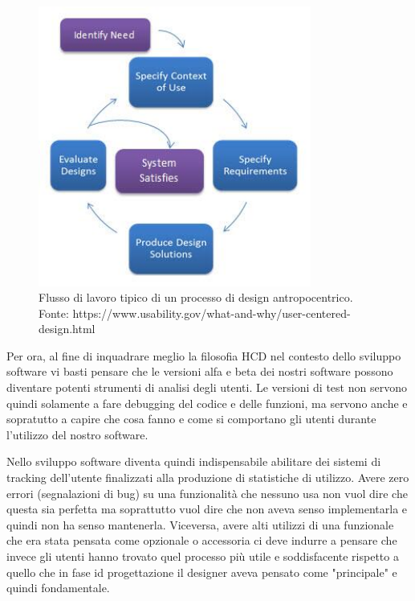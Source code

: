 \begin{figure}[!h]
	\centering
	\includegraphics[width=0.8\textwidth]{immagini/HCD-chart}
	\caption{Flusso di lavoro tipico di un processo di design antropocentrico. Fonte: https://www.usability.gov/what-and-why/user-centered-design.html}
	\label{hcd-chart}
\end{figure}

Per ora, al fine di inquadrare meglio la filosofia HCD nel contesto dello sviluppo software vi basti pensare che le versioni alfa e beta dei nostri software possono diventare potenti strumenti di analisi degli utenti. Le versioni di test non servono quindi solamente a fare debugging del codice e delle funzioni, ma servono anche e sopratutto a capire che cosa fanno e come si comportano gli utenti durante l'utilizzo del nostro software.

Nello sviluppo software diventa quindi indispensabile abilitare dei sistemi di tracking dell'utente finalizzati alla produzione di statistiche di utilizzo. Avere zero errori (segnalazioni di bug) su una funzionalità che nessuno usa non vuol dire che questa sia perfetta ma soprattutto vuol dire che non aveva senso implementarla e quindi non ha senso mantenerla. Viceversa, avere alti utilizzi di una funzionale che era stata pensata come opzionale o accessoria ci deve indurre a pensare che invece gli utenti hanno trovato quel processo più utile e soddisfacente rispetto a quello che in fase id progettazione il designer aveva pensato come "principale" e quindi fondamentale.


